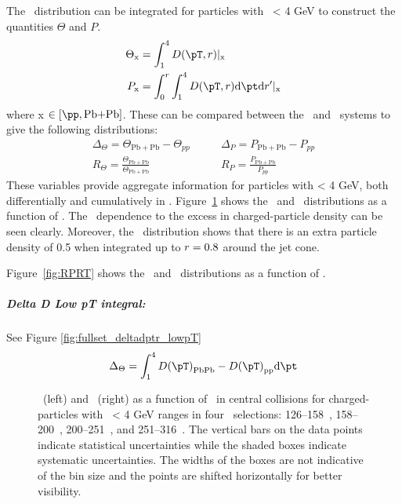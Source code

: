The \Dptr\ distribution can be integrated for particles with \pt\ < 4 GeV to construct the quantities $\Theta$ and $P$.
\begin{align}
\Theta_{\mathrm{x}} &= \int_1^{4} \Dptr |_{\mathrm{x}} \\
P_{\mathrm{x}} &= \int_0^r \int_1^{4} \Dptr \fd \pt \fd r' |_{\mathrm{x}}
\end{align}
where x $\in [\pp, \pbpb]$. These can be compared between the \pp\ and \pbpb\ systems to give the following distributions:
\begin{align}
\Delta_\Theta = \Theta_{\mathrm{Pb+Pb}} - \Theta_{pp} & \qquad  \Delta_P = P_{\mathrm{Pb+Pb}} - P_{pp} \\
R_\Theta = \frac{\Theta_{\mathrm{Pb+Pb}}}{\Theta_{\mathrm{Pb+Pb}}} & \qquad R_P = \frac{P_{\mathrm{Pb+Pb}}}{P_{pp}}
\end{align}
These variables provide aggregate information for particles with \pt < 4 GeV, both differentially and cumulatively in \rvar.
Figure~\ref{fig:deltaPdeltaT} shows the \DeltaTheta\ and \DeltaP\ distributions as a function of \rvar. The \ptjet\ dependence to the excess in charged-particle density can be seen clearly. Moreover, the \DeltaP\ distribution shows that there is an extra particle density of 0.5 when integrated up to $\mbox{$r$} = 0.8$ around the jet cone. 

Figure~\ref{fig:RPRT} shows the \RTheta\ and \RP\ distributions as a function of \rvar. 


\subparagraph{Delta D Low pT integral: } See Figure \ref{fig:fullset_deltadptr_lowpT}
\begin{align}
\Delta_\Theta = \int_1^{4} \Dpt_{\mathrm{PbPb}} - \Dpt_{\mathrm{pp}} \fd \pt
\end{align}
\begin{figure}
   \caption{\DeltaTheta\ (left) and \DeltaP\ (right) as a function of \rvar\ in central collisions for charged-particles with \pt\ < 4 GeV ranges in four \ptjet\ selections: 126--158~\GeV, 158--200~\GeV, 200--251~\GeV, and 251--316~\GeV. The vertical bars on the data points indicate statistical uncertainties while the shaded boxes indicate systematic uncertainties. The widths of the boxes are not indicative of the bin size and the points are shifted horizontally for better visibility. }
      \label{fig:deltaPdeltaT}
\end{figure}


